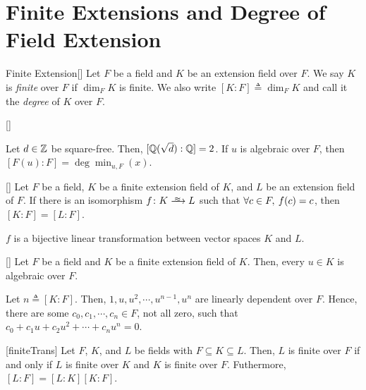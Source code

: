 \documentclass[../modern_algebra_2.tex]{subfiles}
\begin{document}
\section{Finite Extensions and Degree of Field Extension}

\begin{Definition}{Finite Extension}[]
    Let \(F\) be a field and \(K\) be an extension field over \(F\).
    We say \(K\) is \emph{finite} over \(F\) if \(\dim_{F}K\) is finite.
    We also write \([K:F] \triangleq \dim_F K\) and call it the \emph{degree} of \(K\) over \(F\).
\end{Definition}

\begin{Example}{}[]
\begin{enumerate}[label=(\arabic*)]
    \ii
    Let \(d \in \ZZ\) be square-free. Then, \([\QQ(\sqrt{d}):\QQ] = 2\).
    \ii
    If \(u\) is algebraic over \(F\), then
    \([F(u):F] = \deg \min_{u,F}(x)\).
\end{enumerate}
\end{Example}

\begin{Lemma}{}[]
    Let \(F\) be a field, \(K\) be a finite extension field of \(K\),
    and \(L\) be an extension field of \(F\).
    If there is an isomorphism \(f \colon K \isoto L\) such that \(\forall c \in F,\: f(c) = c\),
    then \([K:F] = [L:F]\).
\end{Lemma}
\begin{myproof}[Proof]
    \(f\) is a bijective linear transformation between vector spaces \(K\) and \(L\).
\end{myproof}

\begin{Theorem}{}[]
    Let \(F\) be a field and \(K\) be a finite extension field of \(K\).
    Then, every \(u \in K\) is algebraic over \(F\).
\end{Theorem}
\begin{myproof}[Proof]
    Let \(n \triangleq [K:F]\).
    Then, \(1, u, u^2, \cdots, u^{n-1}, u^n\) are linearly dependent over \(F\).
    Hence, there are some \(c_0, c_1, \cdots, c_n \in F\), not all zero,
    such that \(c_0 + c_1u+c_2u^2 + \cdots + c_nu^n = 0\).
\end{myproof}

\begin{Theorem}{}[finiteTrans]
    Let \(F\), \(K\), and \(L\) be fields with \(F \subseteq K \subseteq L\).
    Then, \(L\) is finite over \(F\) if and only if
    \(L\) is finite over \(K\) and \(K\) is finite over \(F\).
    Futhermore, \([L:F] = [L:K][K:F]\).
\end{Theorem}
\end{document}
